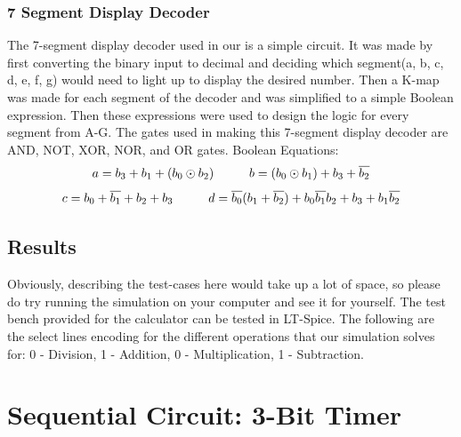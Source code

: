 \documentclass[a4paper,10pt]{article}
\begin{document}
\subsubsection{7 Segment Display Decoder}
The 7-segment display decoder used in our is a simple circuit. It was made by first converting the binary input to decimal and deciding which segment(a, b, c, d, e, f, g) would need to light up to display the desired number. Then a K-map was made for each segment of the decoder and was simplified to a simple Boolean expression. Then these expressions were used to design the logic for every segment from A-G. The gates used in making this 7-segment display decoder are AND, NOT, XOR, NOR, and OR gates. \newline\newline
Boolean Equations:\newline
\hspace*{2cm} \[a = b_3 + b_1 + (b_0 \odot b_2) \hspace*{1cm}  b = (b_0 \odot b_1) + b_3 + \overline{b_2}\]\newline
\hspace*{2cm} \[c = b_0 + \overline{b_1} + b_2 + b_3 \hspace*{1cm}  d = \overline{b_0}(b_1 + \overline{b_2}) + b_0 \overline{b_1} b_2 + b_3 + b_1 \overline{b_2}\]\newline

\subsection{Results}
Obviously, describing the test-cases here would take up a lot of space, so please do try running the simulation on your computer and see it for yourself. The test bench provided for the calculator can be tested in LT-Spice.\newline\newline
The following are the select lines encoding for the different operations that our simulation solves for:\newline{} 0 - Division, 1 - Addition, 0 - Multiplication, 1 - Subtraction.
\newline\newline
\section{Sequential Circuit: 3-Bit Timer}
\end{document}
